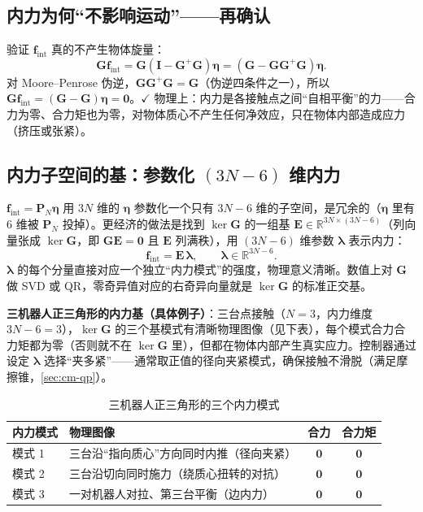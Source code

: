 \subsection{内力为何“不影响运动”——再确认}
\label{sec:cm-internal-verify}
验证 $\mathbf{f}_{\text{int}}$ 真的不产生物体旋量：
\begin{equation}
  \mathbf{G}\mathbf{f}_{\text{int}}=\mathbf{G}(\mathbf{I}-\mathbf{G}^{+}\mathbf{G})\boldsymbol{\eta}=(\mathbf{G}-\mathbf{G}\mathbf{G}^{+}\mathbf{G})\boldsymbol{\eta}.
  \label{eq:cm-int-zero}
\end{equation}
对 Moore--Penrose 伪逆，$\mathbf{G}\mathbf{G}^{+}\mathbf{G}=\mathbf{G}$（伪逆四条件之一），所以 $\mathbf{G}\mathbf{f}_{\text{int}}=(\mathbf{G}-\mathbf{G})\boldsymbol{\eta}=\mathbf{0}$。$\checkmark$ 物理上：内力是各接触点之间“自相平衡”的力——合力为零、合力矩也为零，对物体质心不产生任何净效应，只在物体内部造成应力（挤压或张紧）。

\subsection{内力子空间的基：参数化 \texorpdfstring{$(3N-6)$}{(3N-6)} 维内力}
\label{sec:cm-internal-basis}
$\mathbf{f}_{\text{int}}=\mathbf{P}_N\boldsymbol{\eta}$ 用 $3N$ 维的 $\boldsymbol{\eta}$ 参数化一个只有 $3N-6$ 维的子空间，是冗余的（$\boldsymbol{\eta}$ 里有 $6$ 维被 $\mathbf{P}_N$ 投掉）。更经济的做法是找到 $\ker\mathbf{G}$ 的一组基 $\mathbf{E}\in\mathbb{R}^{3N\times(3N-6)}$（列向量张成 $\ker\mathbf{G}$，即 $\mathbf{G}\mathbf{E}=\mathbf{0}$ 且 $\mathbf{E}$ 列满秩），用 $(3N-6)$ 维参数 $\boldsymbol{\lambda}$ 表示内力：
\begin{equation}
  \mathbf{f}_{\text{int}}=\mathbf{E}\,\boldsymbol{\lambda},\qquad \boldsymbol{\lambda}\in\mathbb{R}^{3N-6}.
  \label{eq:cm-int-basis}
\end{equation}
$\boldsymbol{\lambda}$ 的每个分量直接对应一个独立“内力模式”的强度，物理意义清晰。数值上对 $\mathbf{G}$ 做 SVD 或 QR，零奇异值对应的右奇异向量就是 $\ker\mathbf{G}$ 的标准正交基。

\noindent\textbf{三机器人正三角形的内力基（具体例子）}：三台点接触（$N=3$，内力维度 $3N-6=3$），$\ker\mathbf{G}$ 的三个基模式有清晰物理图像（见下表），每个模式合力合力矩都为零（否则就不在 $\ker\mathbf{G}$ 里），但都在物体内部产生真实应力。控制器通过设定 $\boldsymbol{\lambda}$ 选择“夹多紧”——通常取正值的径向夹紧模式，确保接触不滑脱（满足摩擦锥，\cref{sec:cm-qp}）。

\begin{table}[H]\centering\small
\caption{三机器人正三角形的三个内力模式}
\label{tab:cm-int-modes}
\begin{tabular}{llcc}
\toprule
内力模式 & 物理图像 & 合力 & 合力矩 \\
\midrule
模式 1 & 三台沿“指向质心”方向同时内推（径向夹紧） & $\mathbf{0}$ & $\mathbf{0}$ \\
模式 2 & 三台沿切向同时施力（绕质心扭转的对抗） & $\mathbf{0}$ & $\mathbf{0}$ \\
模式 3 & 一对机器人对拉、第三台平衡（边内力） & $\mathbf{0}$ & $\mathbf{0}$ \\
\bottomrule
\end{tabular}
\end{table}

